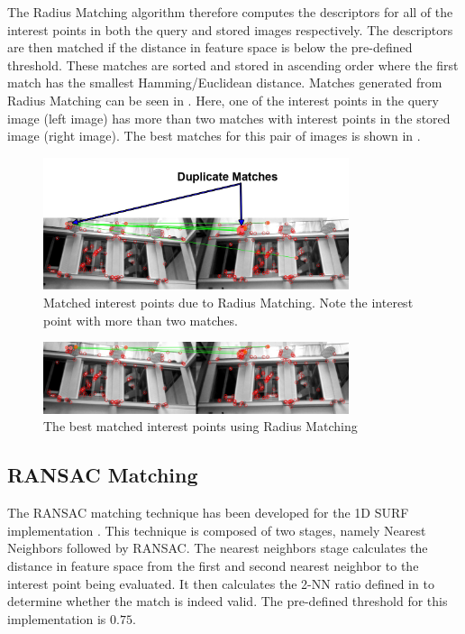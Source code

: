 The Radius Matching algorithm therefore computes the descriptors for all of the interest points in both the query and stored images respectively. The descriptors are then matched if the distance in feature space is below the pre-defined threshold. These matches are sorted and stored in ascending order where the first match has the smallest Hamming/Euclidean distance. Matches generated from Radius Matching can be seen in . Here, one of the interest points in the query image (left image) has more than two matches with interest points in the stored image (right image). The best matches for this pair of images is shown in .\\ 


 \begin{figure}[h!] 
  \centering
    \includegraphics[width=0.8\textwidth]{../Drawings/Matching/feature_matching/dataset1_without_validation_radius_photo.jpg}
    \caption{Matched interest points due to Radius Matching. Note the interest point with more than two matches.}
    \label{fig:radius_match}
\end{figure}

 \begin{figure}[h!] 
  \centering
    \includegraphics[width=0.8\textwidth]{../Drawings/Matching/feature_matching/dataset1_without_validation_radius_best.jpg}
    \caption{The best matched interest points using Radius Matching}
    \label{fig:radius_best_match}
\end{figure}

\subsection{RANSAC Matching}
\label{sec:ransacMatching}
The RANSAC matching technique has been developed for the 1D SURF implementation \citep{Anderson}. This technique is composed of two stages, namely Nearest Neighbors followed by RANSAC. The nearest neighbors stage calculates the distance in feature space from the first and second nearest neighbor to the interest point being evaluated. It then calculates the 2-NN ratio defined in  to determine whether the match is indeed valid. The pre-defined threshold for this implementation is $0.75$.\\

